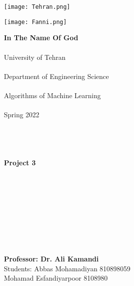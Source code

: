 \documentclass[a4paper,12pt]{article}
\begin{document}
\begin{landscape}
\vspace*{-2.3cm}
\hspace*{13cm}\texttt{[image: Tehran.png]}
\hspace*{-2cm}
\end{landscape}

\begin{landscape}
\vspace*{-4.1cm}
\hspace*{-3cm}\texttt{[image: Fanni.png]}
\hspace*{-2cm}
\end{landscape}

\begin{center}
	\textbf{In The Name Of God}
	\\\;
	\\{\LARGE University of Tehran}
	\\\;
	\\{\Large Department of Engineering Science}
	\\\;
	\\{\Large Algorithms of Machine Learning}
	\\\;
	\\{\Large Spring 2022}
	\\\;
	\\\;
	\\\;
	\\\;
	\\{\Huge \textbf{Project 3}}
	\\\;
	\\\;
	\\\;
	\\\;
	\\\;
	\\\;
	\\\;
	\\\;
	\\\;
	\\\textbf{Professor: Dr. Ali Kamandi}
	\\Students: Abbas Mohamadiyan 810898059
	\\Mohamad Esfandiyarpoor 8108980

\end{center}


\end{document}
